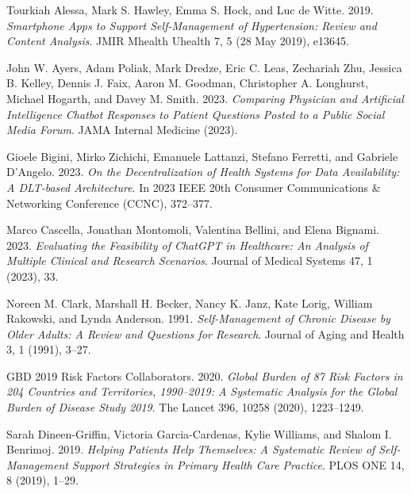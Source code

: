 
\label{Bibliography}

\begin{thebibliography}{55}

Tourkiah Alessa, Mark S. Hawley, Emma S. Hock, and Luc de Witte. 2019. \emph{Smartphone Apps to Support Self-Management of Hypertension: Review and Content Analysis}. JMIR Mhealth Uhealth 7, 5 (28 May 2019), e13645.

John W. Ayers, Adam Poliak, Mark Dredze, Eric C. Leas, Zechariah Zhu, Jessica B. Kelley, Dennis J. Faix, Aaron M. Goodman, Christopher A. Longhurst, Michael Hogarth, and Davey M. Smith. 2023. \emph{Comparing Physician and Artificial Intelligence Chatbot Responses to Patient Questions Posted to a Public Social Media Forum}. JAMA Internal Medicine (2023).

Gioele Bigini, Mirko Zichichi, Emanuele Lattanzi, Stefano Ferretti, and Gabriele D’Angelo. 2023. \emph{On the Decentralization of Health Systems for Data Availability: A DLT-based Architecture}. In 2023 IEEE 20th Consumer Communications \& Networking Conference (CCNC), 372--377.

Marco Cascella, Jonathan Montomoli, Valentina Bellini, and Elena Bignami. 2023. \emph{Evaluating the Feasibility of ChatGPT in Healthcare: An Analysis of Multiple Clinical and Research Scenarios}. Journal of Medical Systems 47, 1 (2023), 33.

Noreen M. Clark, Marshall H. Becker, Nancy K. Janz, Kate Lorig, William Rakowski, and Lynda Anderson. 1991. \emph{Self-Management of Chronic Disease by Older Adults: A Review and Questions for Research}. Journal of Aging and Health 3, 1 (1991), 3--27.

GBD 2019 Risk Factors Collaborators. 2020. \emph{Global Burden of 87 Risk Factors in 204 Countries and Territories, 1990--2019: A Systematic Analysis for the Global Burden of Disease Study 2019}. The Lancet 396, 10258 (2020), 1223--1249.

Sarah Dineen-Griffin, Victoria Garcia-Cardenas, Kylie Williams, and Shalom I. Benrimoj. 2019. \emph{Helping Patients Help Themselves: A Systematic Review of Self-Management Support Strategies in Primary Health Care Practice}. PLOS ONE 14, 8 (2019), 1--29.


\end{thebibliography}
